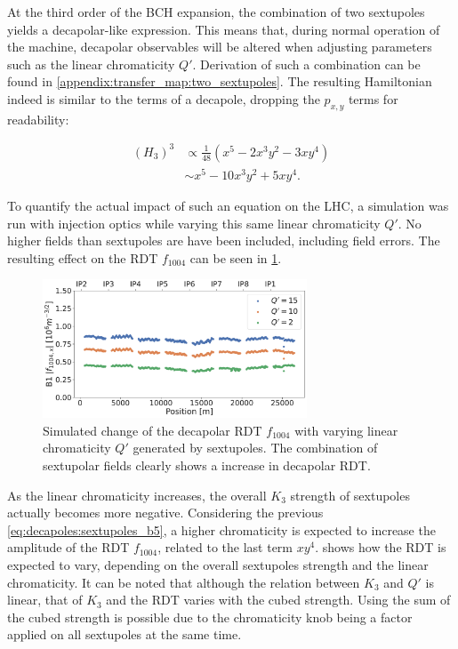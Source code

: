 At the third order of the BCH expansion, the combination of two sextupoles yields a decapolar-like
expression. This means that, during normal operation of the machine, decapolar observables will be
altered when adjusting parameters such as the linear chromaticity $Q'$. 
Derivation of such a combination can be found in \cref{appendix:transfer_map:two_sextupoles}. The
resulting Hamiltonian indeed is similar to the terms of a decapole, dropping the $p_{x,y}$ terms for
readability:

\begin{equation}
    \begin{aligned}
         (H_3)^3 &\propto \frac{1}{48} \left(x^5 - 2x^3y^2 - 3xy^4 \right)\\
                 &\sim    x^5 - 10x^3y^2 + 5xy^4.
    \end{aligned}
    \label{eq:decapoles:sextupoles_b5}
\end{equation}

To quantify the actual impact of such an equation on the LHC, a simulation was run with injection
optics while varying this same linear chromaticity $Q'$. No higher fields than sextupoles are 
have been included, including field errors. The resulting effect on the RDT $f_{1004}$
can be seen in \cref{fig:decapoles:rdts:simulated_f1004_from_sextupoles}.

\begin{figure}[H]
    \centering
    \includegraphics[width=0.7\textwidth]{./images/f1004/f1004_dq.pdf}
    \caption{Simulated change of the decapolar RDT $f_{1004}$ with varying linear
    chromaticity $Q'$ generated by sextupoles. The combination of sextupolar fields clearly shows a 
    increase in decapolar RDT.}
    \label{fig:decapoles:rdts:simulated_f1004_from_sextupoles}
\end{figure}

As the linear chromaticity increases, the overall $K_3$ strength of sextupoles actually becomes 
more negative. Considering the previous \cref{eq:decapoles:sextupoles_b5}, a higher chromaticity
is expected to increase the amplitude of the RDT $f_{1004}$, related to the last term $xy^4$.
 shows how the RDT is expected to vary, depending on the
overall sextupoles strength and the linear chromaticity. It can be noted that although the relation
between $K_3$ and $Q'$ is linear, that of $K_3$ and the RDT varies with the cubed strength. Using 
the sum of the cubed strength is possible due to the chromaticity knob being a factor applied on all
sextupoles at the same time.

